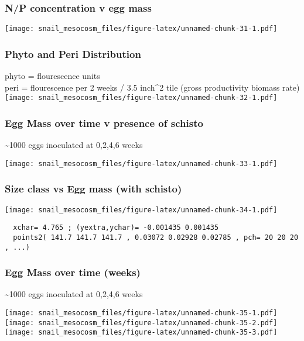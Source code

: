 \documentclass[10,portrait]{article}
\begin{document}
\subsubsection{N/P concentration v egg
mass}\label{np-concentration-v-egg-mass}

\texttt{[image: snail\_mesocosm\_files/figure-latex/unnamed-chunk-31-1.pdf]}

\subsubsection{Phyto and Peri
Distribution}\label{phyto-and-peri-distribution}

phyto = flourescence units\\
peri = flourescence per 2 weeks / 3.5 inch\^{}2 tile (gross productivity
biomass rate)\\
\texttt{[image: snail\_mesocosm\_files/figure-latex/unnamed-chunk-32-1.pdf]}

\subsubsection{Egg Mass over time v presence of
schisto}\label{egg-mass-over-time-v-presence-of-schisto}

\textasciitilde{}1000 eggs inoculated at 0,2,4,6 weeks

\texttt{[image: snail\_mesocosm\_files/figure-latex/unnamed-chunk-33-1.pdf]}

\subsubsection{Size class vs Egg mass (with
schisto)}\label{size-class-vs-egg-mass-with-schisto}

\texttt{[image: snail\_mesocosm\_files/figure-latex/unnamed-chunk-34-1.pdf]}

\begin{verbatim}
  xchar= 4.765 ; (yextra,ychar)= -0.001435 0.001435 
  points2( 141.7 141.7 141.7 , 0.03072 0.02928 0.02785 , pch= 20 20 20 , ...) 
\end{verbatim}

\subsubsection{Egg Mass over time
(weeks)}\label{egg-mass-over-time-weeks}

\textasciitilde{}1000 eggs inoculated at 0,2,4,6 weeks

\texttt{[image: snail\_mesocosm\_files/figure-latex/unnamed-chunk-35-1.pdf]}
\texttt{[image: snail\_mesocosm\_files/figure-latex/unnamed-chunk-35-2.pdf]}
\texttt{[image: snail\_mesocosm\_files/figure-latex/unnamed-chunk-35-3.pdf]}

\printbibliography
\end{document}
